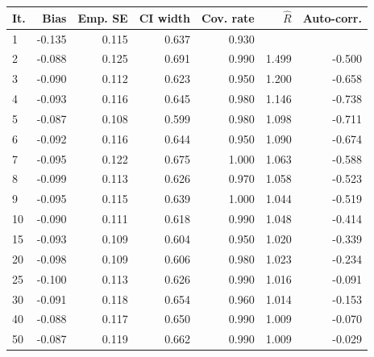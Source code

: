 \documentclass[article]{jss}
\begin{document}
\begin{table}[ht]
\centering
\begin{tabular}{lrrrrrr}
  \hline
It. & Bias & Emp. SE & CI width & Cov. rate & $\widehat{R}$ & Auto-corr. \\ 
  \hline
  1 & -0.135 & 0.115 & 0.637 & 0.930 &  &   \\ 
  2 & -0.088 & 0.125 & 0.691 & 0.990 & 1.499 & -0.500 \\ 
  3 & -0.090 & 0.112 & 0.623 & 0.950 & 1.200 & -0.658 \\ 
  4 & -0.093 & 0.116 & 0.645 & 0.980 & 1.146 & -0.738 \\ 
  5 & -0.087 & 0.108 & 0.599 & 0.980 & 1.098 & -0.711 \\ 
  6 & -0.092 & 0.116 & 0.644 & 0.950 & 1.090 & -0.674 \\ 
  7 & -0.095 & 0.122 & 0.675 & 1.000 & 1.063 & -0.588 \\ 
  8 & -0.099 & 0.113 & 0.626 & 0.970 & 1.058 & -0.523 \\ 
  9 & -0.095 & 0.115 & 0.639 & 1.000 & 1.044 & -0.519 \\ 
  10 & -0.090 & 0.111 & 0.618 & 0.990 & 1.048 & -0.414 \\ 
  15 & -0.093 & 0.109 & 0.604 & 0.950 & 1.020 & -0.339 \\ 
  20 & -0.098 & 0.109 & 0.606 & 0.980 & 1.023 & -0.234 \\ 
  25 & -0.100 & 0.113 & 0.626 & 0.990 & 1.016 & -0.091 \\ 
  30 & -0.091 & 0.118 & 0.654 & 0.960 & 1.014 & -0.153 \\ 
  40 & -0.088 & 0.117 & 0.650 & 0.990 & 1.009 & -0.070 \\ 
  50 & -0.087 & 0.119 & 0.662 & 0.990 & 1.009 & -0.029 \\ 

\end{tabular}
\end{table}
\end{document}
